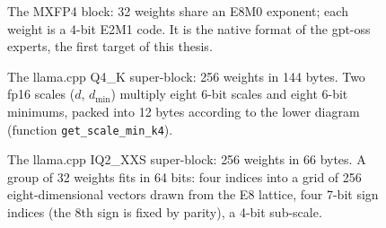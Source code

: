 \begin{figure}[ht]
\centering
\SchemaMXFP
\caption[The MXFP4 block]{The MXFP4 block: 32 weights share an E8M0 exponent; each weight is a 4-bit E2M1 code. It is the native format of the gpt-oss experts, the first target of this thesis.}
\label{fig:mxfp4}
\end{figure}

\begin{figure}[ht]
\centering
\SchemaQquatreK
\caption[The Q4\_K super-block]{The llama.cpp Q4\_K super-block: 256 weights in 144 bytes. Two fp16 scales ($d$, $d_{\min}$) multiply eight 6-bit scales and eight 6-bit minimums, packed into 12 bytes according to the lower diagram (function \texttt{get\_scale\_min\_k4}).}
\label{fig:q4k}
\end{figure}

\begin{figure}[ht]
\centering
\SchemaIQdeux
\caption[The IQ2\_XXS super-block]{The llama.cpp IQ2\_XXS super-block: 256 weights in 66 bytes. A group of 32 weights fits in 64 bits: four indices into a grid of 256 eight-dimensional vectors drawn from the E8 lattice, four 7-bit sign indices (the 8th sign is fixed by parity), a 4-bit sub-scale.}
\label{fig:iq2xxs}
\end{figure}


